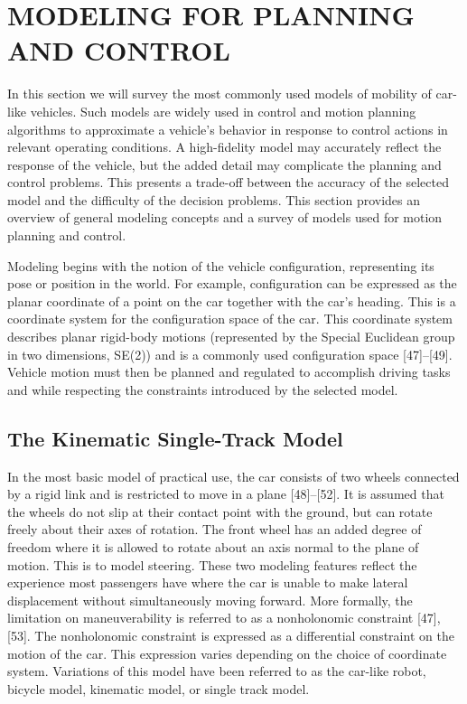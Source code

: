 \documentclass[a4paper,10pt]{article}
\begin{document}
\section{MODELING FOR PLANNING AND CONTROL}
In this section we will survey the most commonly used models of mobility of car-like vehicles. Such models are widely used in control and motion planning algorithms to approximate a vehicle’s behavior in response to control actions in relevant operating conditions. A high-fidelity model may accurately reflect the response of the vehicle, but the added detail may complicate the planning and control problems. This presents a trade-off between the accuracy of the selected model and the difficulty of the decision problems. This section provides an overview of general modeling concepts and a survey of models used for motion planning and control.

Modeling begins with the notion of the vehicle configuration, representing its pose or position in the world. For example, configuration can be expressed as the planar coordinate of a point on the car together with the car’s heading. This is a coordinate system for the configuration space of the car. This coordinate system describes planar rigid-body motions (represented by the Special Euclidean group in two dimensions, SE(2)) and is a commonly used configuration space [47]–[49]. Vehicle motion must then be planned and regulated to accomplish driving tasks and while respecting the constraints introduced by the selected model.

\subsection{The Kinematic Single-Track Model}
In the most basic model of practical use, the car consists of two wheels connected by a rigid link and is restricted to move in a plane [48]–[52]. It is assumed that the wheels do not slip at their contact point with the ground, but can rotate freely about their axes of rotation. The front wheel has an added degree of freedom where it is allowed to rotate about an axis normal to the plane of motion. This is to model steering. These two modeling features reflect the experience most passengers have where the car is unable to make lateral displacement without simultaneously moving forward. More formally, the limitation on maneuverability is referred to as a nonholonomic constraint [47], [53]. The nonholonomic constraint is expressed as a differential constraint on the motion of the car. This expression varies depending on the choice of coordinate system. Variations of this model have been referred to as the car-like robot, bicycle model, kinematic model, or single track model.
\end{document}
